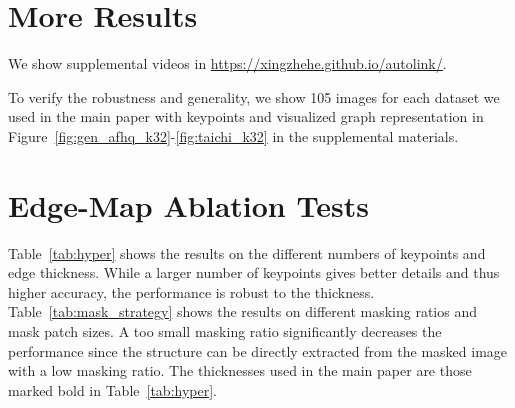 \documentclass{article}
\begin{document}
\clearpage


\clearpage
\appendix

\section{More Results}  \label{supp:more_results}
We show supplemental videos in \url{https://xingzhehe.github.io/autolink/}.

To verify the robustness and generality, we show 105 images for each dataset we used in the main paper with keypoints and visualized graph representation in Figure~\ref{fig:gen_afhq_k32}-\ref{fig:taichi_k32} in the supplemental materials.


\section{Edge-Map Ablation Tests} \label{supp:ablation_test}

Table~\ref{tab:hyper} shows the results on the different numbers of keypoints and edge thickness. While a larger number of keypoints gives better details and thus higher accuracy, the performance is robust to the thickness.
Table~\ref{tab:mask_strategy} shows the results on different masking ratios and mask patch sizes. A too small masking ratio significantly decreases the performance since the structure can be directly extracted from the masked image with a low masking ratio. The thicknesses used in the main paper are those marked bold in Table~\ref{tab:hyper}. 
\end{document}
